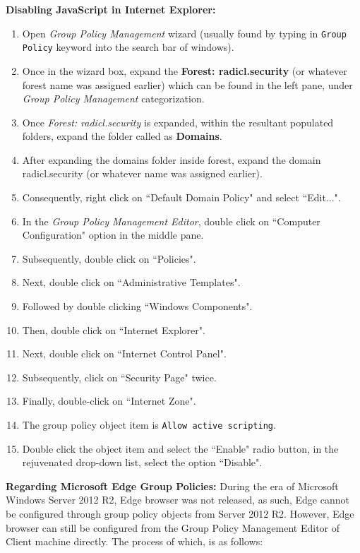 \documentclass[12pt]{extarticle}
\newcommand{\ben}{\begin{enumerate}}
\newcommand{\een}{\end{enumerate}}
\begin{document}
		\textbf{Disabling JavaScript in Internet Explorer:}
		\ben
			\item Open \textit{Group Policy Management} wizard (usually found by typing in \texttt{Group Policy} keyword into the search bar of windows).
			\item Once in the wizard box, expand the \textbf{Forest: radicl.security} (or whatever forest name was assigned earlier) which can be found in the left pane, under \textit{Group Policy Management} categorization.
			\item Once \textit{Forest: radicl.security} is expanded, within the resultant populated folders, expand the folder called as \textbf{Domains}.
			\item After expanding the domains folder inside forest, expand the domain radicl.security (or whatever name was assigned earlier).
			\item Consequently, right click on ``Default Domain Policy" and select ``Edit...".
			\item In the \textit{Group Policy Management Editor}, double click on ``Computer Configuration" option in the middle pane.
			\item Subsequently, double click on ``Policies".
			\item Next, double click on ``Administrative Templates".
			\item Followed by double clicking ``Windows Components".
			\item Then, double click on ``Internet Explorer".
			\item Next, double click on ``Internet Control Panel".
			\item Subsequently, click on ``Security Page" twice. 
			\item Finally, double-click on ``Internet Zone".
			\item The group policy object item is \texttt{Allow active scripting}.
			\item Double click the object item and select the ``Enable" radio button, in the rejuvenated drop-down list, select the option ``Disable".
		\een
		
		\vspace{4mm}
		\textbf{Regarding Microsoft Edge Group Policies:} During the era of Microsoft Windows Server 2012 R2, Edge browser was not released, as such, Edge cannot be configured through group policy objects from Server 2012 R2. However, Edge browser can still be configured from the Group Policy Management Editor of Client machine directly. The process of which, is as follows:
		
\end{document}
